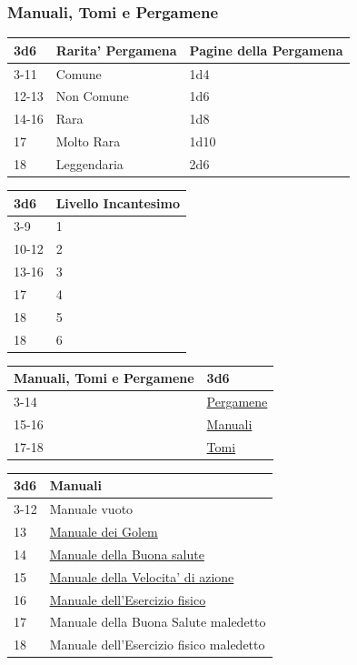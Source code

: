 \begin{multicols}{2}
{\subsubsection{Manuali, Tomi e Pergamene}\hypertarget{manualitomi}{}\label{manualitomi}\label{CPergamene}\hypertarget{CPergamene}{}

{\small \begin{tabularx}{\linewidth}{lll}
		\toprule
\textbf{3d6} & \textbf{Rarita' Pergamena} & \textbf{Pagine della Pergamena}\\
\toprule
3-11 &Comune & 1d4 \\
12-13 &Non Comune & 1d6 \\
14-16 &Rara & 1d8 \\
17 & Molto Rara & 1d10\\
18 & Leggendaria & 2d6\\
\end{tabularx}}

\medskip

{\small \begin{tabularx}{\linewidth}{ll}
		\toprule
	\textbf{3d6} & \textbf{Livello Incantesimo}\\
	\toprule
	3-9 & 1 \\
	10-12 & 2 \\
	13-16 & 3  \\
	17 & 4  \\
	18 & 5 \\
	18 & 6 \\
\end{tabularx}}

\medskip

{\small\begin{tabularx}{\linewidth}{ll}
		\toprule
		\textbf{Manuali, Tomi e Pergamene}&\textbf{3d6}\\
		\toprule
3-14 &	\hyperlink{manualitomi}{Pergamene}\\
15-16&	\hyperlink{manualitomi}{Manuali} \\
17-18&	\hyperlink{manualitomi}{Tomi}
\end{tabularx}}

\medskip\hypertarget{Manuali}{}

\noindent\begin{tabularx}{\linewidth}{ll}
	\toprule
\textbf{3d6} & \textbf{Manuali}\\
\toprule
3-12 & Manuale vuoto\\
13 & \hyperlink{Manuale dei Golem}{Manuale dei Golem}\\
14 & \hyperlink{Manuale della Buonasalute}{Manuale della Buona salute}\\
15 & \hyperlink{Manuale della Velocita' di azione}{Manuale della Velocita' di azione}\\
16 & \hyperlink{Manuale dell'Esercizio fisico}{Manuale dell'Esercizio fisico}\\
17 & Manuale della Buona Salute maledetto\\
18 & Manuale dell'Esercizio fisico maledetto
\end{tabularx}

}
\end{multicols}
